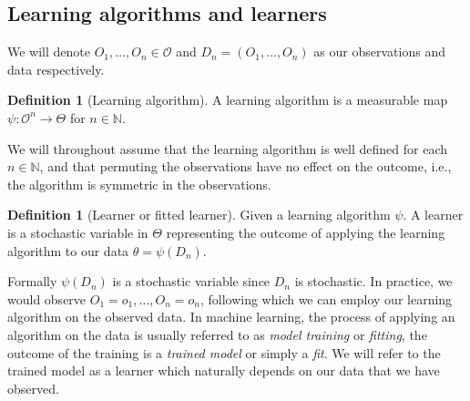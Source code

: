 \documentclass[11pt, a4paper]{article}
\theoremstyle{definition}
\newtheorem{definition}[theorem]{Definition}
\theoremstyle{remark}
\newcommand{\btheta}{\theta}
\newcommand{\la}{\psi}
\begin{document}
\subsection{Learning algorithms and learners}
We will denote $ O_1 , \dots , O_n \in \mathcal{O} $ and $ D_n = (O_1 , \dots , O_n) $ as our observations and data respectively. 
\begin{definition}[Learning algorithm]
    A learning algorithm is a measurable map $ \la : \mathcal{O}^{n} \to \Theta $ for $ n \in \mathbb{N} $. 
\end{definition}
We will throughout assume that the learning algorithm is well defined for each $ n \in \mathbb{N} $, and that permuting the observations have no effect on the outcome, i.e., the algorithm is symmetric in the observations.  
\begin{definition}[Learner or fitted learner]
    Given a learning algorithm $ \la $. A learner is a stochastic variable in $ \Theta $ representing the outcome of applying the learning algorithm to our data $ \btheta = \la(D_n) $.
\end{definition}
Formally $ \la(D_n) $ is a stochastic variable since $ D_n $ is stochastic. In practice, we would observe $ O_1 = o_1, \dots, O_n = o_n $, following which we can employ our learning algorithm on the observed data. In machine learning, the process of applying an algorithm on the data is usually referred to as \textit{model training} or \textit{fitting}, the outcome of the training is a \textit{trained model} or simply a \textit{fit}. We will refer to the trained model as a learner which naturally depends on our data that we have observed. 
\end{document}
